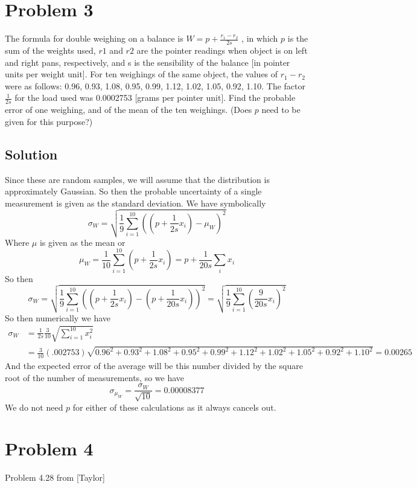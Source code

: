 \documentclass[]{article}
\begin{document}
	\section*{Problem 3}
		The formula for double weighing on a balance is $W =
		p + \frac{r_1 - r_2}{2s}$
		, in which $p$ is the sum of the weights used, $r1$ and $r2$ are the pointer
		readings when object is on left and right pans, respectively, and s is the sensibility of
		the balance [in pointer units per weight unit]. For ten weighings of the same object,
		the values of $r_1 -r_2$ were as follows: 0.96, 0.93, 1.08, 0.95, 0.99, 1.12, 1.02, 1.05, 0.92,
		1.10. The factor $\frac{1}{2s}$ for the load used was 0.0002753 [grams per pointer unit]. Find the probable error of one weighing, and of the mean of the ten weighings. (Does $p$ need to
		be given for this purpose?)
		\subsection*{Solution}
			Since these are random samples, we will assume that the distribution is approximately Gaussian. So then the probable uncertainty of a single measurement is given as the standard deviation. We have symbolically
			\[
				\sigma_W = \sqrt{\frac{1}{9}\sum^{10}_{i=1}\left(\left(p + \frac{1}{2s}x_i\right) - \mu_W\right)^2}
			\]
			Where $\mu$ is given as the mean or 
			\[
				\mu_W = \frac{1}{10}\sum_{i=1}^{10}\left(p + \frac{1}{2s}x_i\right) = p + \frac{1}{20s}\sum_{i}x_i
			\]
			So then
			\[
				\sigma_W = \sqrt{\frac{1}{9}\sum^{10}_{i=1}\left(\left(p + \frac{1}{2s}x_i\right) - \left(p + \frac{1}{20s}x_i\right)\right)^2} = \sqrt{\frac{1}{9}\sum^{10}_{i=1}\left( \frac{9}{20s}x_i\right)^2} 
			\]
			So then numerically we have 
			\begin{align*}
				\sigma_W &= \frac{1}{2s}\frac{3}{10}\sqrt{\sum^{10}_{i=1} x_i^2}\\
				&= \frac{3}{10}(.002753)\sqrt{0.96^2+ 0.93^2+1.08^2+0.95^2+0.99^2+1.12^2+1.02^2+1.05^2+0.92^2+1.10^2} = 0.00265
			\end{align*}
			And the expected error of the average will be this number divided by the square root of the number of measurements, so we have 
			\[\sigma_{\mu_W} = \frac{\sigma_W}{\sqrt{10}} = 0.00008377\]
			We do not need $p$ for either of these calculations as it always cancels out.
	\section*{Problem 4}
		Problem 4.28 from [Taylor]
\end{document}
